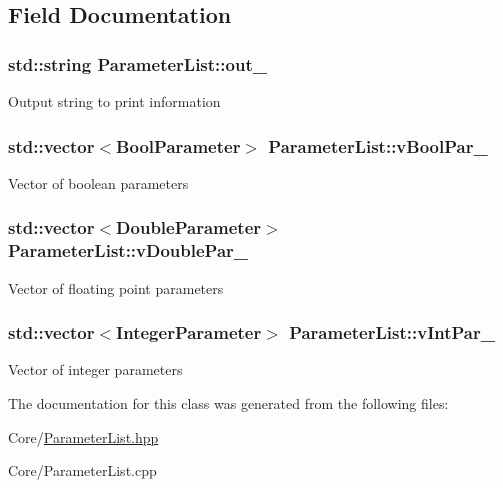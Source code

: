 \subsection{Field Documentation}
\hypertarget{class_parameter_list_a8091ca235596882df0e06a3fcd5345c6}{
\subsubsection[{out\-\_\-}]{\setlength{\rightskip}{0pt plus 5cm}std\-::string Parameter\-List\-::out\-\_\-\hspace{0.3cm}{\ttfamily [protected]}}}\label{class_parameter_list_a8091ca235596882df0e06a3fcd5345c6}
Output string to print information \hypertarget{class_parameter_list_a71da57a577ae374300d2b30c3481bccd}{
\subsubsection[{v\-Bool\-Par\-\_\-}]{\setlength{\rightskip}{0pt plus 5cm}std\-::vector$<${\bf Bool\-Parameter}$>$ Parameter\-List\-::v\-Bool\-Par\-\_\-\hspace{0.3cm}{\ttfamily [protected]}}}\label{class_parameter_list_a71da57a577ae374300d2b30c3481bccd}
Vector of boolean parameters \hypertarget{class_parameter_list_ae2c308362f7b1f3ea063677d2e28ad3c}{
\subsubsection[{v\-Double\-Par\-\_\-}]{\setlength{\rightskip}{0pt plus 5cm}std\-::vector$<${\bf Double\-Parameter}$>$ Parameter\-List\-::v\-Double\-Par\-\_\-\hspace{0.3cm}{\ttfamily [protected]}}}\label{class_parameter_list_ae2c308362f7b1f3ea063677d2e28ad3c}
Vector of floating point parameters \hypertarget{class_parameter_list_a9398a16845891a6cf22230771636b439}{
\subsubsection[{v\-Int\-Par\-\_\-}]{\setlength{\rightskip}{0pt plus 5cm}std\-::vector$<${\bf Integer\-Parameter}$>$ Parameter\-List\-::v\-Int\-Par\-\_\-\hspace{0.3cm}{\ttfamily [protected]}}}\label{class_parameter_list_a9398a16845891a6cf22230771636b439}
Vector of integer parameters 

The documentation for this class was generated from the following files\-:\begin{DoxyCompactItemize}
\item 
Core/\hyperlink{_parameter_list_8hpp}{Parameter\-List.\-hpp}\item 
Core/Parameter\-List.\-cpp\end{DoxyCompactItemize}
